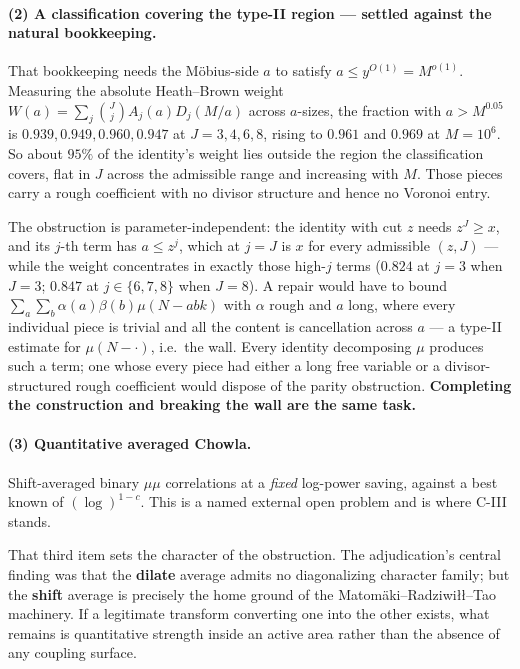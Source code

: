 \documentclass[11pt,a4paper]{article}
\theoremstyle{plain}
\theoremstyle{definition}
\begin{document}
\paragraph{(2) A classification covering the type-II region ---
settled against the natural bookkeeping.} That bookkeeping needs the
M\"obius-side $a$ to satisfy $a \le y^{O(1)} = M^{o(1)}$. Measuring the
absolute Heath--Brown weight
$W(a) = \sum_j \binom{J}{j} A_j(a) D_j(M/a)$ across $a$-sizes, the
fraction with $a > M^{0.05}$ is $0.939, 0.949, 0.960, 0.947$ at
$J = 3, 4, 6, 8$, rising to $0.961$ and $0.969$ at $M = 10^6$. So
about $95\%$ of the identity's weight lies outside the region the
classification covers, flat in $J$ across the admissible range and
increasing with $M$. Those pieces carry a rough coefficient with no
divisor structure and hence no Voronoi entry.

The obstruction is parameter-independent: the identity with cut $z$
needs $z^J \ge x$, and its $j$-th term has $a \le z^j$, which at
$j = J$ is $x$ for every admissible $(z,J)$ --- while the weight
concentrates in exactly those high-$j$ terms ($0.824$ at $j=3$ when
$J=3$; $0.847$ at $j \in \{6,7,8\}$ when $J=8$). A repair would have
to bound $\sum_a\sum_b \alpha(a)\beta(b)\mu(N-abk)$ with $\alpha$
rough and $a$ long, where every individual piece is trivial and all
the content is cancellation across $a$ --- a type-II estimate for
$\mu(N-\cdot)$, i.e.\ the wall. Every identity decomposing $\mu$
produces such a term; one whose every piece had either a long free
variable or a divisor-structured rough coefficient would dispose of
the parity obstruction. \textbf{Completing the construction and
breaking the wall are the same task.}

\paragraph{(3) Quantitative averaged Chowla.} Shift-averaged binary
$\mu\mu$ correlations at a \emph{fixed} log-power saving, against a
best known of $(\log)^{1-c}$. This is a named external open problem
and is where C-III stands.

That third item sets the character of the obstruction. The
adjudication's central finding was that the \textbf{dilate} average
admits no diagonalizing character family; but the \textbf{shift}
average is precisely the home ground of the
Matom\"aki--Radziwi\l\l--Tao machinery. If a legitimate transform
converting one into the other exists, what remains is quantitative
strength inside an active area rather than the absence of any coupling
surface.
\end{document}
